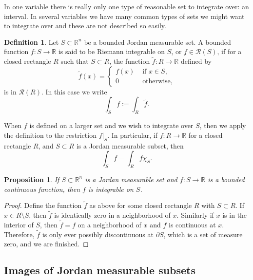 \documentclass[12pt]{book}
\newcommand{\R}{{\mathbb{R}}}
\newcommand{\sR}{{\mathcal{R}}}
\theoremstyle{plain}
\newtheorem{prop}[thm]{Proposition}
\theoremstyle{remark}
\theoremstyle{definition}
\newtheorem{defn}[thm]{Definition}
\theoremstyle{exercise}
\theoremstyle{example}
\begin{document}
In one variable there is really only one type of reasonable set to integrate over:
an interval.   In several variables we have many common types of sets we might
want to integrate over and these are not described so easily.

\begin{defn}
Let $S \subset \R^n$ be a bounded Jordan measurable set.
A bounded function $f \colon S \to \R$
is said to be Riemann integrable on $S$, or $f \in \sR(S)$, if for a closed
rectangle $R$ such that $S \subset R$, the function $\widetilde{f} \colon R
\to \R$ defined  by
\begin{equation*}
\widetilde{f}(x) =
\begin{cases}
f(x) & \text{ if $x \in S$}, \\
0 & \text{ otherwise},
\end{cases}
\end{equation*}
is in $\sR(R)$.  In this case we write
\begin{equation*}
\int_S f := \int_R \widetilde{f}.
\end{equation*}
\end{defn}

When $f$ is defined on a larger set and we wish to integrate over $S$, then
we apply the definition to the restriction $f|_S$.  In particular, 
if $f \colon R \to \R$ for a closed rectangle $R$, and $S \subset R$ is
a Jordan measurable subset, then
\begin{equation*}
\int_S f = \int_R f \chi_S .
\end{equation*}

\begin{prop}
If $S \subset \R^n$ is a Jordan measurable set and $f \colon S \to \R$
is a bounded continuous function, then $f$ is integrable on $S$.
\end{prop}

\begin{proof}
Define the function $\widetilde{f}$ as above for some closed rectangle $R$ with $S
\subset R$.  If $x \in R \setminus \overline{S}$, then $\widetilde{f}$
is identically zero in a neighborhood of $x$.  Similarly if $x$ is in the
interior of $S$, then $\widetilde{f} = f$ on a neighborhood of $x$
and $f$ is continuous at $x$.  Therefore, $\widetilde{f}$ is only ever
possibly discontinuous at $\partial S$, which is a set of measure zero,
and we are finished.
\end{proof}

\subsection{Images of Jordan measurable subsets}
\end{document}
